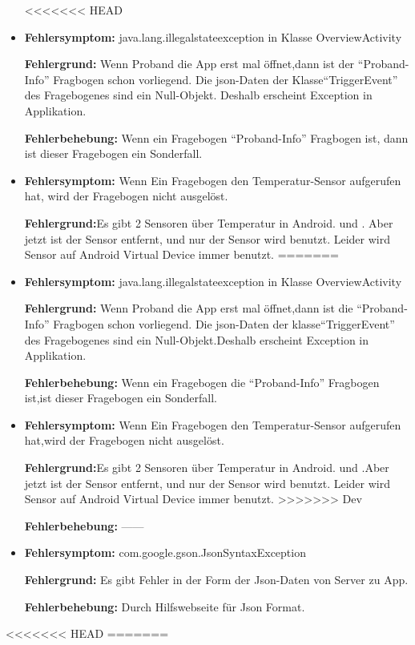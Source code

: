 \documentclass[a4paper]{scrreprt}
\begin{document}
			  \begin{itemize}
<<<<<<< HEAD
				   \item \textbf{Fehlersymptom:} java.lang.illegalstateexception in Klasse OverviewActivity
				  	\par \textbf{Fehlergrund:} Wenn Proband die App erst mal öffnet,dann ist der ``Proband-Info'' Fragbogen schon vorliegend. Die json-Daten der Klasse``TriggerEvent'' des Fragebogenes sind ein Null-Objekt. Deshalb erscheint Exception in Applikation.
			  		\par \textbf{Fehlerbehebung:} Wenn ein Fragebogen ``Proband-Info'' Fragbogen ist, dann ist dieser Fragebogen ein Sonderfall.
                  \item \textbf{Fehlersymptom:} Wenn Ein Fragebogen den Temperatur-Sensor aufgerufen hat, wird der Fragebogen nicht ausgel\"ost.
				  \par \textbf{Fehlergrund:}Es gibt 2  Sensoren \"uber Temperatur in Android. {\color{blue}{TYPE-TEMPERATURE }} und {\color{blue}{TYPE-AMBIENT-TEMPERATURE }}. Aber jetzt ist der Sensor {\color{blue}{TYPE-TEMPERATURE }} entfernt, und nur der Sensor {\color{blue}{TYPE-AMBIENT-TEMPERATURE }} wird benutzt. Leider wird Sensor {\color{blue}{TYPE-TEMPERATURE }} auf Android Virtual Device immer benutzt.
=======
				  \item \textbf{Fehlersymptom:} java.lang.illegalstateexception in Klasse OverviewActivity
				  	\par \textbf{Fehlergrund:} Wenn Proband die App erst mal öffnet,dann ist die ``Proband-Info'' Fragbogen schon vorliegend. Die json-Daten der klasse``TriggerEvent'' des Fragebogenes sind ein Null-Objekt.Deshalb erscheint Exception in Applikation.
			  		\par \textbf{Fehlerbehebung:} Wenn ein Fragebogen die ``Proband-Info'' Fragbogen ist,ist dieser Fragebogen ein Sonderfall.

                  \item \textbf{Fehlersymptom:} Wenn Ein Fragebogen den Temperatur-Sensor aufgerufen hat,wird der Fragebogen nicht ausgelöst.
				  \par \textbf{Fehlergrund:}Es gibt 2 Sensoren \"uber Temperatur in Android. \color{blue}{TYPE_TEMPERATURE} und \color{blue}{TYPE_AMBIENT_TEMPERATURE}.Aber jetzt ist der Sensor \color{blue}{TYPE_TEMPERATURE} entfernt, und nur der Sensor \color{blue}{TYPE_AMBIENT_TEMPERATURE} wird benutzt. Leider wird Sensor \color{blue}{TYPE_TEMPERATURE} auf Android Virtual Device immer benutzt.
>>>>>>> Dev
			  	  \par\textbf{Fehlerbehebung:} ——

                  \item \textbf{Fehlersymptom:} com.google.gson.JsonSyntaxException
				  \par \textbf{Fehlergrund:} Es gibt Fehler in der Form der Json-Daten von Server zu App.
			  	  \par\textbf{Fehlerbehebung:} Durch Hilfswebseite f\"ur Json Format.


			  \end{itemize}
<<<<<<< HEAD
=======
\end{document}
